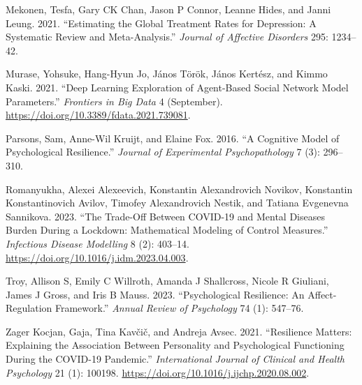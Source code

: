\documentclass[
  letterpaper,
  DIV=11,
  numbers=noendperiod]{scrartcl}
\newlength{\cslhangindent}
\newenvironment{CSLReferences}[2] %
 {\begin{list}{}{%
  \setlength{\itemindent}{0pt}
  \setlength{\leftmargin}{0pt}
  \setlength{\parsep}{0pt}
  \ifodd #1
   \setlength{\leftmargin}{\cslhangindent}
   \setlength{\itemindent}{-1\cslhangindent}
  \fi
  \setlength{\itemsep}{#2\baselineskip}}}
 {\end{list}}
\begin{document}
\begin{CSLReferences}{1}{0}
Mekonen, Tesfa, Gary CK Chan, Jason P Connor, Leanne Hides, and Janni
Leung. 2021. {``Estimating the Global Treatment Rates for Depression: A
Systematic Review and Meta-Analysis.''} \emph{Journal of Affective
Disorders} 295: 1234--42.

Murase, Yohsuke, Hang-Hyun Jo, János Török, János Kertész, and Kimmo
Kaski. 2021. {``Deep Learning Exploration of Agent-Based Social Network
Model Parameters.''} \emph{Frontiers in Big Data} 4 (September).
\url{https://doi.org/10.3389/fdata.2021.739081}.

Parsons, Sam, Anne-Wil Kruijt, and Elaine Fox. 2016. {``A Cognitive
Model of Psychological Resilience.''} \emph{Journal of Experimental
Psychopathology} 7 (3): 296--310.

Romanyukha, Alexei Alexeevich, Konstantin Alexandrovich Novikov,
Konstantin Konstantinovich Avilov, Timofey Alexandrovich Nestik, and
Tatiana Evgenevna Sannikova. 2023. {``The Trade-Off Between COVID-19 and
Mental Diseases Burden During a Lockdown: Mathematical Modeling of
Control Measures.''} \emph{Infectious Disease Modelling} 8 (2): 403--14.
\url{https://doi.org/10.1016/j.idm.2023.04.003}.

Troy, Allison S, Emily C Willroth, Amanda J Shallcross, Nicole R
Giuliani, James J Gross, and Iris B Mauss. 2023. {``Psychological
Resilience: An Affect-Regulation Framework.''} \emph{Annual Review of
Psychology} 74 (1): 547--76.

Zager Kocjan, Gaja, Tina Kavčič, and Andreja Avsec. 2021. {``Resilience
Matters: Explaining the Association Between Personality and
Psychological Functioning During the COVID-19 Pandemic.''}
\emph{International Journal of Clinical and Health Psychology} 21 (1):
100198. \url{https://doi.org/10.1016/j.ijchp.2020.08.002}.

\end{CSLReferences}
\end{document}
